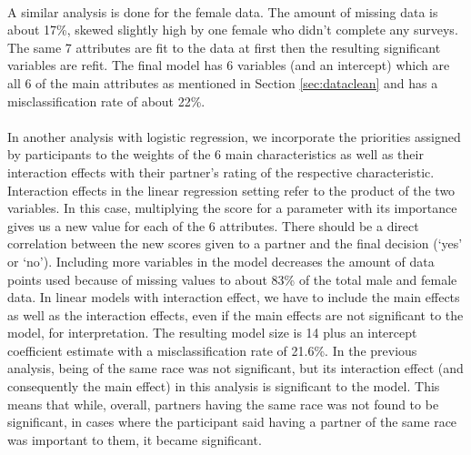 \documentclass{article}
\begin{document}
\null\\
A similar analysis is done for the female data.  The amount of missing data is about 17\%, skewed slightly high by one female who didn't complete any surveys.  The same 7 attributes are fit to the data at first then the resulting significant variables are refit.  The final model has 6 variables (and an intercept) which are all 6 of the main attributes as mentioned in Section \ref{sec:dataclean} and has a misclassification rate of about 22\%.  \\
\null\\
In another analysis with logistic regression, we incorporate the priorities assigned by participants to the weights of the 6 main characteristics as well as their interaction effects with their partner's rating of the respective characteristic.  Interaction effects in the linear regression setting refer to the product of the two variables.  In this case, multiplying the score for a parameter with its importance gives us a new value for each of the 6 attributes. There should be a direct correlation between the new scores given to a partner and the final decision (`yes' or `no').  Including more variables in the model decreases the amount of data points used because of missing values to about 83\% of the total male and female data.  In linear models with interaction effect, we have to include the main effects as well as the interaction effects, even if the main effects are not significant to the model, for interpretation. The resulting model size is 14 plus an intercept coefficient estimate with a misclassification rate of 21.6\%. In the previous analysis, being of the same race was not significant, but its interaction effect (and consequently the main effect) in this analysis is significant to the model. This means that while, overall, partners having the same race was not found to be significant, in cases where the participant said having a partner of the same race was important to them, it became significant.
%
\end{document}
